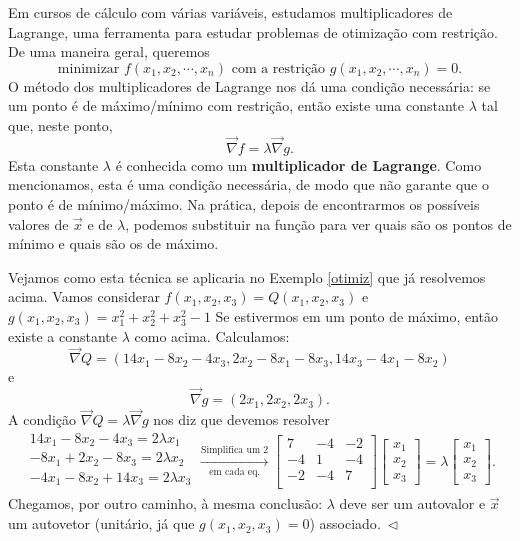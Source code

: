 \documentclass[../livro.tex]{subfiles}
\begin{document}
\begin{remark}[Opcional]
	Em cursos de cálculo com várias variáveis, estudamos multiplicadores de Lagrange, uma ferramenta para estudar problemas de otimização com restrição. De uma maneira geral, queremos
	\[
	\text{minimizar } f(x_1, x_2, \cdots, x_n) \text{ com a restrição } g(x_1, x_2, \cdots, x_n) = 0.
	\] O método dos multiplicadores de Lagrange nos dá uma condição necessária: se um ponto é de máximo/mínimo com restrição, então existe uma constante $\lambda$ tal que, neste ponto,
	\[
	\vec{\nabla} f = \lambda \vec{\nabla} g.
	\] Esta constante $\lambda$ é conhecida como um \textbf{multiplicador de Lagrange}. Como mencionamos, esta é uma condição necessária, de modo que não garante que o ponto é de mínimo/máximo. Na prática, depois de encontrarmos os possíveis valores de $\vec{x}$ e de $\lambda$, podemos substituir na função para ver quais são os pontos de mínimo e quais são os de máximo.
	
	Vejamos como esta técnica se aplicaria no Exemplo \ref{otimiz} que já resolvemos acima. Vamos considerar $f(x_1,x_2,x_3) = Q(x_1,x_2,x_3)$ e $g(x_1,x_2,x_3) = x_1^2 + x_2^2 + x_3^2 - 1$ Se estivermos em um ponto de máximo, então existe a constante $\lambda$ como acima. Calculamos:
	\[
	\vec{\nabla} Q = \left( 14x_1 - 8x_2 - 4 x_3, 2x_2 - 8 x_1 - 8 x_3, 14x_3 - 4 x_1 - 8 x_2 \right) 
	\] e 
	\[
	\vec{\nabla} g = \left( 2 x_1, 2 x_2, 2 x_3 \right) .
	\] A condição $\vec{\nabla} Q = \lambda \vec{\nabla} g$ nos diz que devemos resolver
	\[
	\begin{array}{c}
	14 x_1 - 8x_2 - 4 x_3 = 2 \lambda x_1 \\
	-8x_1 + 2x_2  - 8 x_3 = 2 \lambda x_2 \\
	- 4x_1 - 8 x_2 +14x_3 = 2 \lambda x_3 \\
	\end{array} \xrightarrow[\text{em cada eq.}]{\text{Simplifica um $2$}}
	\begin{bmatrix}
	7 & -4 & -2 \\
	-4 & 1 & -4 \\
	-2 & -4 & 7 \\
	\end{bmatrix} 
	\begin{bmatrix}
	x_1 \\ x_2 \\ x_3
	\end{bmatrix} = \lambda
	\begin{bmatrix}
	x_1 \\ x_2 \\ x_3
	\end{bmatrix}.
	\] Chegamos, por outro caminho, à mesma conclusão: $\lambda$ deve ser um autovalor e $\vec{x}$ um autovetor (unitário, já que $g(x_1,x_2,x_3) = 0$) associado$. \ \lhd$
\end{remark}
\end{document}
